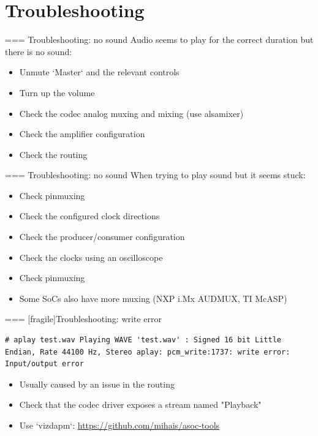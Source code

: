 \section{Troubleshooting}

=== {Troubleshooting: no sound}
  Audio seems to play for the correct duration but there is no sound:
  \begin{itemize}
  \item Unmute `Master` and the relevant controls
  \item Turn up the volume
  \item Check the codec analog muxing and mixing (use alsamixer)
  \item Check the amplifier configuration
  \item Check the routing
  \end{itemize}


=== {Troubleshooting: no sound}
  When trying to play sound but it seems stuck:
  \begin{itemize}
  \item Check pinmuxing
  \item Check the configured clock directions
  \item Check the producer/consumer configuration
  \item Check the clocks using an oscilloscope
  \item Check pinmuxing
  \item Some SoCs also have more muxing (NXP i.Mx AUDMUX, TI McASP)
  \end{itemize}


=== [fragile]{Troubleshooting: write error}
  \begin{block}{}
    \fontsize{10}{10}\selectfont
    \begin{verbatim}
# aplay test.wav Playing WAVE 'test.wav' : Signed 16 bit Little Endian, Rate 44100 Hz, Stereo aplay: pcm_write:1737: write error: Input/output error
    \end{verbatim}
  \end{block}
  \begin{itemize}
  \item Usually caused by an issue in the routing
  \item Check that the codec driver exposes a stream named "Playback"
  \item Use `vizdapm`:
    \url{https://github.com/mihais/asoc-tools}
  \end{itemize}


